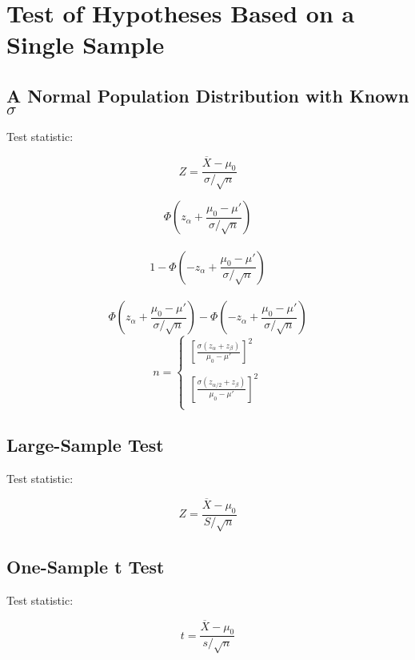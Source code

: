 \documentclass[UTF8]{ctexart}
\numberwithin{equation}{subsection}%
\begin{document}
	\section{Test of Hypotheses Based on a Single Sample}
	\subsection{A Normal Population Distribution with Known $\sigma$}
	Test statistic:
	\begin{Large}
	$$Z = \frac{\overline{X}-\mu_0}{\sigma/\sqrt n}$$
	
	$$\varPhi\left(z_\alpha+\frac{\mu_0-\mu'}{\sigma/\sqrt n}\right)$$
	~\\		
	$$1-\varPhi\left(-z_\alpha+\frac{\mu_0-\mu'}{\sigma/\sqrt n}\right)$$
	~\\		
	$$\varPhi\left(z_\alpha+\frac{\mu_0-\mu'}{\sigma/\sqrt n}\right)-\varPhi\left(-z_\alpha+\frac{\mu_0-\mu'}{\sigma/\sqrt n}\right)$$
	$$n=\begin{cases}
		\left[\frac{\sigma(z_\alpha+z_\beta)}{\mu_0-\mu'}\right]^2\\
        ~\\
		\left[\frac{\sigma(z_{\alpha/2}+z_\beta)}{\mu_0-\mu'}\right]^2\\
	\end{cases}$$
	\end{Large}
	\subsection{Large-Sample Test}
	Test statistic:
	\begin{Large}
		$$Z = \frac{\overline{X}-\mu_{\scriptscriptstyle 0}}{S/\sqrt n}$$
	\end{Large}
	\subsection{One-Sample t Test}
	Test statistic:
	\begin{Large}
		$$t = \frac{\overline{X}-\mu_{\scriptscriptstyle 0}}{s/\sqrt n}$$
	\end{Large}
\end{document}
